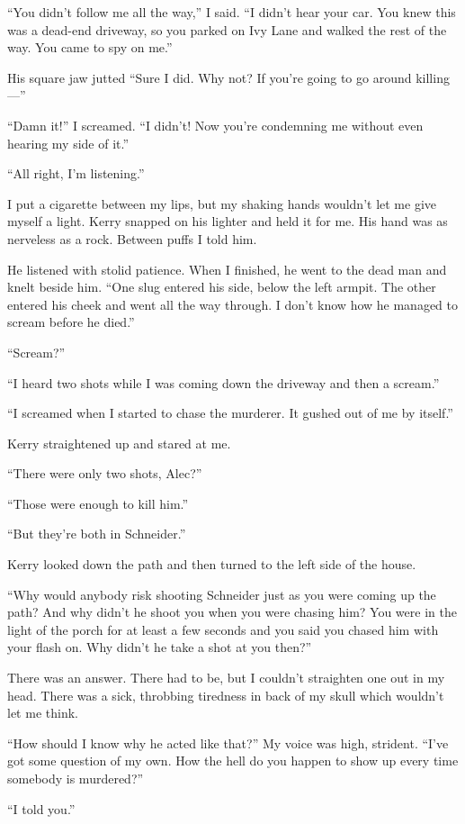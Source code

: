 \documentclass{novel}
\begin{document}
“You didn’t follow me all the way,” I said. “I didn’t hear your car. You knew this was a dead-end driveway, so you parked on Ivy Lane and walked the rest of the way. You came to spy on me.”

His square jaw jutted “Sure I did. Why not? If you’re going to go around killing—”

“Damn it!” I screamed. “I didn’t! Now you’re condemning me without even hearing my side of it.”

“All right, I’m listening.”

I put a cigarette between my lips, but my shaking hands wouldn’t let me give myself a light. Kerry snapped on his lighter and held it for me. His hand was as nerveless as a rock. Between puffs I told him.

He listened with stolid patience. When I finished, he went to the dead man and knelt beside him. “One slug entered his side, below the left armpit. The other entered his cheek and went all the way through. I don’t know how he managed to scream before he died.”

“Scream?”

“I heard two shots while I was coming down the driveway and then a scream.”

“I screamed when I started to chase the murderer. It gushed out of me by itself.”

Kerry straightened up and stared at me. 

“There were only two shots, Alec?”

“Those were enough to kill him.”

“But they’re both in Schneider.” 

Kerry looked down the path and then turned to the left side of the house. 

“Why would anybody risk shooting Schneider just as you were coming up the path? And why didn’t he shoot you when you were chasing him? You were in the light of the porch for at least a few seconds and you said you chased him with your flash on. Why didn’t he take a shot at you then?”

There was an answer. There had to be, but I couldn’t straighten one out in my head. There was a sick, throbbing tiredness in back of my skull which wouldn’t let me think.

“How should I know why he acted like that?” My voice was high, strident. “I’ve got some question of my own. How the hell do you happen to show up every time somebody is murdered?”

“I told you.”
\end{document}
